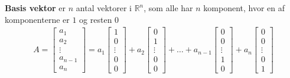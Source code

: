 \begin{defn}
\textbf{Basis vektor} er $n$ antal vektorer i $\mathds{R}^n$, som alle har $n$ komponent, hvor en af komponenterne er $1$ og resten $0$
\begin{align*}
A=
\begin{bmatrix}
a_1\\
a_2\\
\vdots\\
a_{n-1}\\
a_n
\end{bmatrix}=
a_1
\begin{bmatrix}
1\\
0\\
\vdots\\
0\\
0
\end{bmatrix}
+
a_2
\begin{bmatrix}
0\\
1\\
\vdots\\
0\\
0
\end{bmatrix}
+
\dots
+a_{n-1}
\begin{bmatrix}
0\\
0\\
\vdots\\
1\\
0
\end{bmatrix}
+
a_n
\begin{bmatrix}
0\\
0\\
\vdots\\
0\\
1
\end{bmatrix}
\end{align*}
\end{defn}
